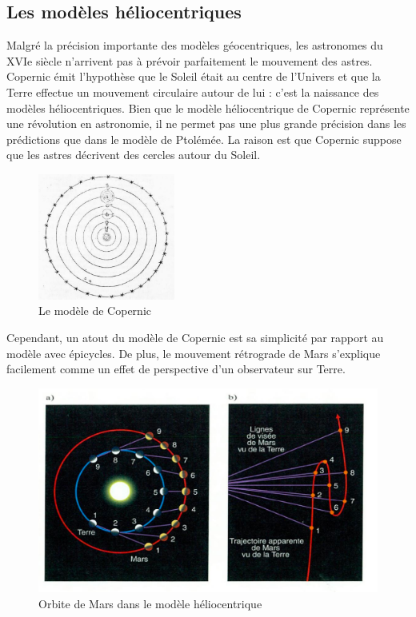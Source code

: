 \documentclass[
  letterpaper,
  DIV=11,
  numbers=noendperiod]{scrartcl}
\theoremstyle{definition}
\theoremstyle{definition}
\theoremstyle{definition}
\theoremstyle{remark}
\begin{document}
\subsection{Les modèles
héliocentriques}\label{les-moduxe8les-huxe9liocentriques}

Malgré la précision importante des modèles géocentriques, les astronomes
du XVIe siècle n'arrivent pas à prévoir parfaitement le mouvement des
astres. Copernic émit l'hypothèse que le Soleil était au centre de
l'Univers et que la Terre effectue un mouvement circulaire autour de lui
: c'est la naissance des modèles héliocentriques. Bien que le modèle
héliocentrique de Copernic représente une révolution en astronomie, il
ne permet pas une plus grande précision dans les prédictions que dans le
modèle de Ptolémée. La raison est que Copernic suppose que les astres
décrivent des cercles autour du Soleil.

\begin{figure}[H]

{\centering \includegraphics[width=0.4\textwidth,height=\textheight]{figures/grav/copernic.pdf}

}

\caption{Le modèle de Copernic}

\end{figure}%

Cependant, un atout du modèle de Copernic est sa simplicité par rapport
au modèle avec épicycles. De plus, le mouvement rétrograde de Mars
s'explique facilement comme un effet de perspective d'un observateur sur
Terre.

\begin{figure}[H]

{\centering \includegraphics[width=1\textwidth,height=\textheight]{figures/grav/mars-2.pdf}

}

\caption{Orbite de Mars dans le modèle héliocentrique}

\end{figure}%
\end{document}
